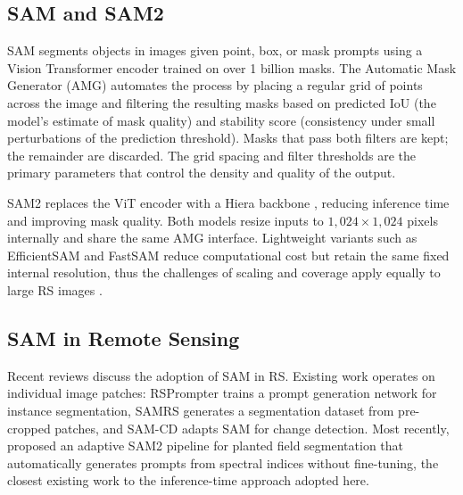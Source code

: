 \documentclass[review,11pt,authoryear]{elsarticle}
\begin{document}
\subsection{SAM and SAM2}
\label{sec:related_sam}

SAM \citep{kirillov2023segment} segments objects in images given point, box, or mask prompts using a Vision Transformer encoder \citep{dosovitskiy2021vit} trained on over 1 billion masks. The Automatic Mask Generator (AMG) automates the process by placing a regular grid of points across the image and filtering the resulting masks based on predicted IoU (the model's estimate of mask quality) and stability score (consistency under small perturbations of the prediction threshold). Masks that pass both filters are kept; the remainder are discarded. The grid spacing and filter thresholds are the primary parameters that control the density and quality of the output.

SAM2 \citep{ravi2024sam2} replaces the ViT encoder with a Hiera backbone \citep{ryali2023hiera}, reducing inference time and improving mask quality. Both models resize inputs to $1{,}024 \times 1{,}024$ pixels internally and share the same AMG interface. Lightweight variants such as EfficientSAM \citep{xiong2024efficientsam} and FastSAM \citep{zhao2023fastsam} reduce computational cost but retain the same fixed internal resolution, thus the challenges of scaling and coverage apply equally to large RS images \citep{zhang2025sam2survey}.

\subsection{SAM in Remote Sensing}
\label{sec:related_sam_rs}

Recent reviews \citep{osco2023sam_rs_review, wan2025samrs_survey} discuss the adoption of SAM in RS. Existing work operates on individual image patches: RSPrompter \citep{chen2024rsprompter} trains a prompt generation network for instance segmentation, SAMRS \citep{wang2024samrs} generates a segmentation dataset from pre-cropped patches, and SAM-CD \citep{ding2024samcd} adapts SAM for change detection. Most recently, \citet{liu2026asamps} proposed an adaptive SAM2 pipeline for planted field segmentation that automatically generates prompts from spectral indices without fine-tuning, the closest existing work to the inference-time approach adopted here.
\end{document}
